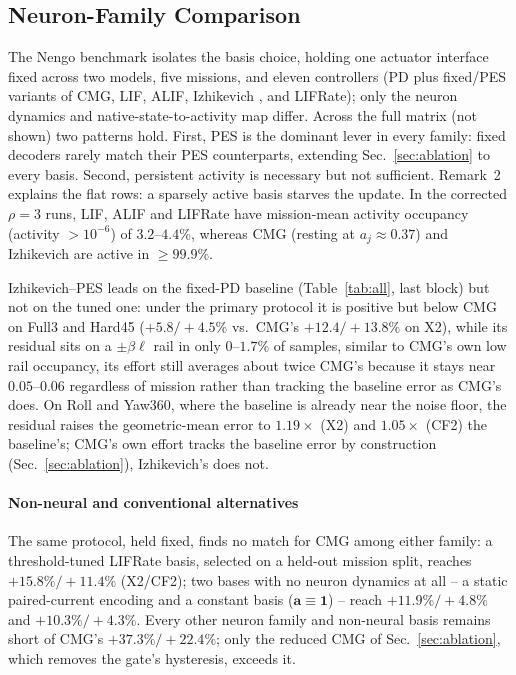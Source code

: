 \documentclass[letterpaper, 10 pt, conference]{ieeeconf}
\begin{document}
\subsection{Neuron-Family Comparison}
\label{sec:family}

The Nengo benchmark isolates the basis choice, holding one actuator interface fixed across two models, five missions, and eleven controllers (PD plus fixed/PES variants of CMG, LIF, ALIF, Izhikevich \cite{izhikevich2003}, and LIFRate); only the neuron dynamics and native-state-to-activity map differ. Across the full matrix (not shown) two patterns hold. First, PES is the dominant lever in every family: fixed decoders rarely match their PES counterparts, extending Sec.~\ref{sec:ablation} to every basis. Second, persistent activity is necessary but not sufficient. Remark~2 explains the flat rows: a sparsely active basis starves the update. In the corrected $\rho=3$ runs, LIF, ALIF and LIFRate have mission-mean activity occupancy (activity $>10^{-6}$) of $3.2$--$4.4\%$, whereas CMG (resting at $a_j\approx0.37$) and Izhikevich are active in ${\ge}99.9\%$.

Izhikevich--PES leads on the fixed-PD baseline (Table~\ref{tab:all}, last block) but not on the tuned one: under the primary protocol it is positive but below CMG on Full3 and Hard45 ($+5.8/+4.5\%$ vs.\ CMG's $+12.4/+13.8\%$ on X2), while its residual sits on a $\pm\beta\ell$ rail in only $0$--$1.7\%$ of samples, similar to CMG's own low rail occupancy, its effort still averages about twice CMG's because it stays near $0.05$--$0.06$ regardless of mission rather than tracking the baseline error as CMG's does. On Roll and Yaw360, where the baseline is already near the noise floor, the residual raises the geometric-mean error to $1.19\times$ (X2) and $1.05\times$ (CF2) the baseline's; CMG's own effort tracks the baseline error by construction (Sec.~\ref{sec:ablation}), Izhikevich's does not.

\paragraph{Non-neural and conventional alternatives} The same protocol, held fixed, finds no match for CMG among either family: a threshold-tuned LIFRate basis, selected on a held-out mission split, reaches $+15.8\%/+11.4\%$ (X2/CF2); two bases with no neuron dynamics at all -- a static paired-current encoding and a constant basis ($\bm a\equiv\bm1$) -- reach $+11.9\%/+4.8\%$ and $+10.3\%/+4.3\%$. Every other neuron family and non-neural basis remains short of CMG's $+37.3\%/+22.4\%$; only the reduced CMG of Sec.~\ref{sec:ablation}, which removes the gate's hysteresis, exceeds it.
\end{document}
